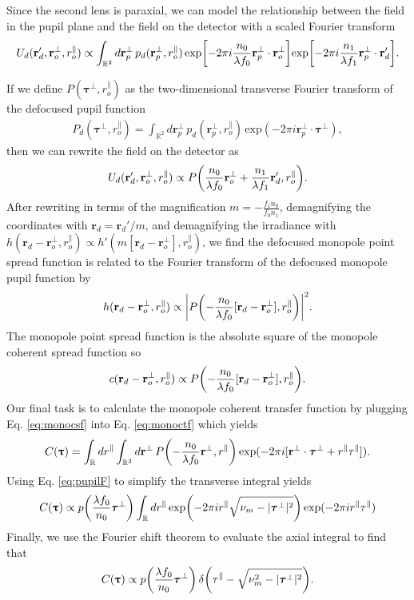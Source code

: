 \documentclass[]{osa-article}
\let\originalleft\left
\let\originalright\right
\renewcommand{\left}{\mathopen{}\mathclose\bgroup\originalleft}
\renewcommand{\right}{\aftergroup\egroup\originalright}
\providecommand{\mb}[1]{\mathbf{#1}}
\newcommand{\mypar}{\parallel}
\providecommand{\ropar}{r_o^{\mypar}}
\providecommand{\roperp}{\mathbf{r}_o^{\bot}}
\providecommand{\rpperp}{\mathbf{r}_p^{\bot}}
\providecommand{\rd}{\mathbf{r}_d}
\providecommand{\mbb}[1]{\mathbb{#1}}
\providecommand{\bs}[1]{\boldsymbol{#1}}
\providecommand{\bt}{\bs{\uptau}}
\providecommand{\btperp}{\bs{\tau}^{\bot}}
\providecommand{\btpar}{\tau^{\mypar}}
\begin{document}
Since the second lens is paraxial, we can model the relationship between the field in the pupil plane and the field on the detector with a scaled Fourier transform
\begin{align}
  U_d(\rd', \roperp, \ropar) \propto \int_{\mbb{R}^2}d\rpperp\,p_d(\rpperp, \ropar)\,\text{exp}\left[-2\pi i \frac{n_0}{\lambda f_0}\rpperp\cdot\roperp\right]\text{exp}\left[-2\pi i \frac{n_1}{\lambda f_1}\rpperp\cdot\rd'\right].
\end{align}

If we define $P(\btperp, \ropar)$ as the two-dimensional transverse Fourier transform of the defocused pupil function
\begin{align}
  P_d(\btperp, \ropar) = \int_{\mbb{R}^2}d\rpperp\, p_d(\rpperp, \ropar)\,\text{exp}(-2\pi i \rpperp\cdot\btperp),\label{eq:pupilF}
\end{align}
then we can rewrite the field on the detector as
\begin{align}
  U_d(\rd', \roperp, \ropar) \propto P\left(\frac{n_0}{\lambda f_0}\roperp + \frac{n_1}{\lambda f_1}\rd', \ropar\right).
\end{align}
After rewriting in terms of the magnification $m = -\frac{f_1 n_0}{f_0 n_1}$, demagnifying the coordinates with $\rd = \rd'/m$, and demagnifying the irradiance with $h(\rd - \roperp, \ropar) \propto h'(m[\rd - \roperp], \ropar) $, we find the defocused monopole point spread function is related to the Fourier transform of the defocused monopole pupil function by 
\begin{align}
  h(\rd-\roperp, \ropar) \propto \left|P\left(-\frac{n_0}{\lambda f_0}[\rd - \roperp], \ropar\right)\right|^2.
\end{align}
The monopole point spread function is the absolute square of the monopole coherent spread function so
\begin{align}
  c(\rd - \roperp, \ropar) \propto P\left(-\frac{n_0}{\lambda f_0}[\rd - \roperp], \ropar\right). \label{eq:monocsf}
\end{align}
Our final task is to calculate the monopole coherent transfer function by plugging Eq. \eqref{eq:monocsf} into Eq. \eqref{eq:monoctf} which yields
\begin{align}
  C(\bt) = \int_{\mbb{R}}dr^{\mypar}\int_{\mbb{R}^2}d\mb{r}^{\bot}\, P\left(-\frac{n_0}{\lambda f_0}\mb{r}^{\bot}, r^{\mypar}\right)\,\text{exp}(-2\pi i[\mb{r}^{\bot}\cdot\btperp + r^{\mypar}\btpar]).
\end{align}
Using Eq. \eqref{eq:pupilF} to simplify the transverse integral yields
\begin{align}
  C(\bt) \propto p\left(\frac{\lambda f_0}{n_0}\btperp\right) \int_{\mbb{R}}d r^{\mypar} \,\text{exp}\left(-2\pi i r^{\mypar}\sqrt{\nu_m - |\btperp|^2}\right)\,\text{exp}(-2\pi i r^{\mypar}\btpar)
\end{align}
Finally, we use the Fourier shift theorem to evaluate the axial integral to find that 
\begin{align}
  C(\bt) \propto p\left(\frac{\lambda f_0}{n_0}\btperp\right)\,\delta\left(\btpar - \sqrt{\nu_m^2 - |\btperp|^2}\right).\label{eq:monoctf}
\end{align}
\end{document}
